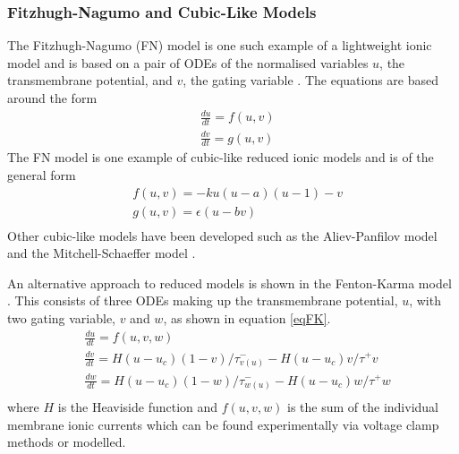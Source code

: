 \subsubsection{Fitzhugh-Nagumo and Cubic-Like Models}
The Fitzhugh-Nagumo (FN) model is one such example of a lightweight ionic model and is based on a pair of ODEs of the normalised variables $u$, the transmembrane potential, and $v$, the gating variable \citep{fitzhugh}. The equations are based around the form
\begin{equation}
    \begin{split}
        & \frac{du}{dt} = f(u,v) \\
        & \frac{dv}{dt} = g(u,v)
    \end{split}
    \label{FNeq}
\end{equation}
The FN model is one example of cubic-like reduced ionic models and is of the general form 
\begin{equation}
    \begin{split}
        & f(u,v) = -ku(u-a)(u-1)-v \\
        & g(u,v) = \epsilon(u-bv) \\
    \end{split}
\end{equation}
Other cubic-like models have been developed such as the Aliev-Panfilov model \citep{alievpanfilov} and the Mitchell-Schaeffer model \citep{mitchellSchaeffer}. \par

An alternative approach to reduced models is shown in the Fenton-Karma model \citep{fentonkarma}. This consists of three ODEs making up the transmembrane potential, $u$, with two gating variable, $v$ and $w$, as shown in equation \ref{eqFK}.
\begin{equation}
    \begin{split}
        & \frac{du}{dt} = f(u,v,w) \\
        & \frac{dv}{dt} = H(u-u_c)(1-v)/\tau^{-}_{v(u)} - H(u-u_c)v/\tau^{+}{v} \\
        & \frac{dw}{dt} = H(u-u_c)(1-w)/\tau^{-}_{w(u)} - H(u-u_c)w/\tau^{+}{w} \\
    \end{split}
    \label{eqFK}
\end{equation}
where $H$ is the Heaviside function and $f(u,v,w)$ is the sum of the individual membrane ionic currents which can be found experimentally via voltage clamp methods or modelled. \par

